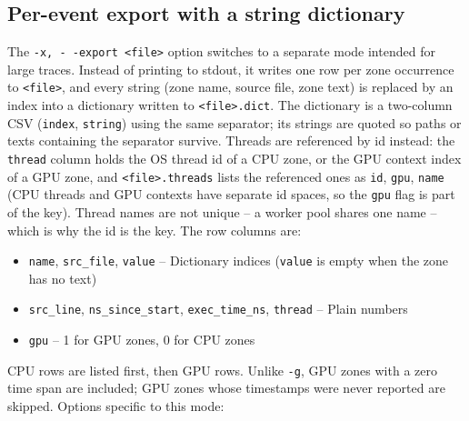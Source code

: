 \documentclass[hidelinks,titlepage,a4paper,twoside]{article}
\begin{document}
\subsection{Per-event export with a string dictionary}
\label{csvexportdict}

The \texttt{-x, -\hspace{-1.25ex} -export <file>} option switches to a separate mode intended for large traces. Instead of printing to stdout, it writes one row per zone occurrence to \texttt{<file>}, and every string (zone name, source file, zone text) is replaced by an index into a dictionary written to \texttt{<file>.dict}. The dictionary is a two-column CSV (\texttt{index}, \texttt{string}) using the same separator; its strings are quoted so paths or texts containing the separator survive. Threads are referenced by id instead: the \texttt{thread} column holds the OS thread id of a CPU zone, or the GPU context index of a GPU zone, and \texttt{<file>.threads} lists the referenced ones as \texttt{id}, \texttt{gpu}, \texttt{name} (CPU threads and GPU contexts have separate id spaces, so the \texttt{gpu} flag is part of the key). Thread names are not unique -- a worker pool shares one name -- which is why the id is the key. The row columns are:

\begin{itemize}
  \item \texttt{name}, \texttt{src\_file}, \texttt{value} -- Dictionary indices (\texttt{value} is empty when the zone has no text)
  \item \texttt{src\_line}, \texttt{ns\_since\_start}, \texttt{exec\_time\_ns}, \texttt{thread} -- Plain numbers
  \item \texttt{gpu} -- 1 for GPU zones, 0 for CPU zones
\end{itemize}

CPU rows are listed first, then GPU rows. Unlike \texttt{-g}, GPU zones with a zero time span are included; GPU zones whose timestamps were never reported are skipped. Options specific to this mode:
\end{document}
